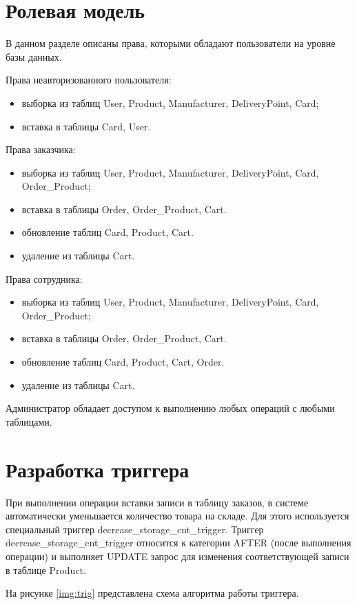 \section{Ролевая модель}
В данном разделе описаны права, которыми обладают пользователи на уровне базы данных.

Права неавторизованного пользователя:
\begin{itemize}
	\item выборка из таблиц User, Product, Manufacturer, DeliveryPoint, Card;
	\item вставка в таблицы Card, User.
\end{itemize}

Права заказчика:
\begin{itemize}
	\item выборка из таблиц User, Product, Manufacturer, DeliveryPoint, Card, Order\_Product;
	\item вставка в таблицы Order, Order\_Product, Cart.
	\item обновление таблиц Card, Product, Cart.
	\item удаление из таблицы Cart.
\end{itemize}

Права сотрудника:
\begin{itemize}
	\item выборка из таблиц User, Product, Manufacturer, DeliveryPoint, Card, Order\_Product;
	\item вставка в таблицы Order, Order\_Product, Cart.
	\item обновление таблиц Card, Product, Cart, Order.
	\item удаление из таблицы Cart.
\end{itemize}

Администратор обладает доступом к выполнению любых операций с любыми таблицами.

\section{Разработка триггера}
При выполнении операции вставки записи в таблицу заказов, в системе автоматически уменьшается количество товара на складе.
Для этого используется специальный триггер decrease\_storage\_cnt\_trigger. 
Триггер decrease\_storage\_cnt\_trigger относится к категории AFTER (после выполнения операции) и выполняет UPDATE запрос для изменения соответствующей записи в таблице Product.

\clearpage
На рисунке \ref{img:trig} представлена схема алгоритма работы триггера.




